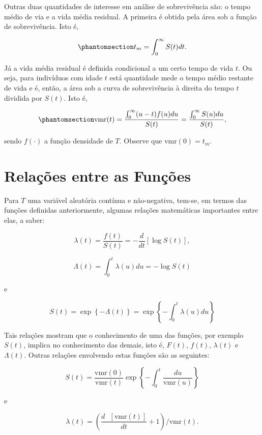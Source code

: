 \documentclass[
  12pt,
  letterpaper,
  DIV=11,
  numbers=noendperiod]{scrreprt}
\begin{document}
Outras duas quantidades de interesse em análise de sobrevivência são: o
tempo médio de via e a vida média residual. A primeira é obtida pela
área sob a função de sobrevivência. Isto é,

\begin{equation}\phantomsection\label{eq-TempMuxe9dio}{
t_{m} = \int_{0}^{\infty} S(t) dt.
}\end{equation}

Já a vida média residual é definida condicional a um certo tempo de vida
\(t\). Ou seja, para indivíduos com idade \(t\) está quantidade mede o
tempo médio restante de vida e é, então, a área sob a curva de
sobrevivência à direita do tempo \(t\) dividida por \(S(t)\). Isto é,

\begin{equation}\phantomsection\label{eq-TemVidaMediaResid}{
\text{vmr}(t) = \dfrac{\int_{0}^{\infty} (u - t) f(u) du}{S(t)} = \dfrac{\int_{0}^{\infty} S(u) du}{S(t)},
}\end{equation}

sendo \(f(\cdot)\) a função densidade de \(T\). Observe que
\(\text{vmr}(0) = t_{m}\).

\section{Relações entre as
Funções}\label{relauxe7uxf5es-entre-as-funuxe7uxf5es}

Para \(T\) uma variável aleatória contínua e não-negativa, tem-se, em
termos das funções definidas anteriormente, algumas relações matemáticas
importantes entre elas, a saber:

\[
\lambda(t) = \dfrac{f(t)}{S(t)} = - \dfrac{d}{dt} \left[ \log S(t) \right],
\]

\[
\Lambda(t) = \int_0^{t} \lambda(u) du = - \log S(t)
\]

e

\[
S(t) = \exp \left\{ - \Lambda(t) \right\} = \exp \left\{ - \int_0^{t} \lambda(u) du \right\}
\]

Tais relações mostram que o conhecimento de uma das funções, por exemplo
\(S(t)\), implica no conhecimento das demais, isto é, \(F(t)\),
\(f(t)\), \(\lambda(t)\) e \(\Lambda(t)\). Outras relações envolvendo
estas funções são as seguintes:

\[ 
S(t) = \dfrac{\text{vmr}(0)}{\text{vmr}(t)} \exp \left\{ - \int_{0}^{t} \dfrac{du}{\text{vmr}(u)} \right\}
\]

e

\[
\lambda(t) = \left( \dfrac{d \text{ } [\text{vmr}(t)]}{dt} + 1 \right) / \text{vmr}(t).
\]
\end{document}
